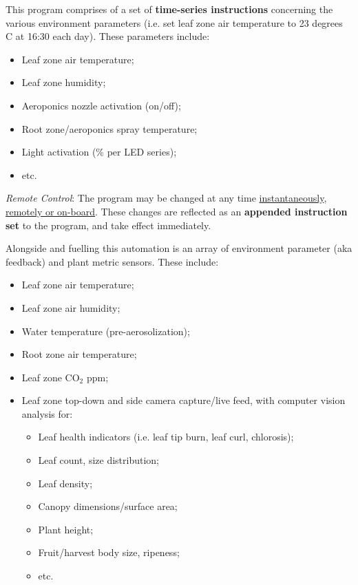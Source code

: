 \documentclass{report}
\begin{document}
This program comprises of a set of \textbf{time-series instructions} concerning the various environment parameters (i.e. set leaf zone air temperature to 23 degrees C at 16:30 each day). These parameters include:
\begin{itemize}
    \item Leaf zone air temperature;
    \item Leaf zone humidity;
    \item Aeroponics nozzle activation (on/off);
    \item Root zone/aeroponics spray temperature;
    \item Light activation (\% per LED series);
    \item etc.
\end{itemize}

\textit{Remote Control}: The program may be changed at any time \uline{instantaneously}, \uline{remotely or on-board}. These changes are reflected as an \textbf{appended instruction set} to the program, and take effect immediately. 

Alongside and fuelling this automation is an array of environment parameter (aka feedback) and plant metric sensors. These include:
\begin{itemize}
    \item Leaf zone air temperature;
    \item Leaf zone air humidity;
    \item Water temperature (pre-aerosolization);
    \item Root zone air temperature;
    \item Leaf zone CO${}_2$ ppm;
    \item Leaf zone top-down and side camera capture/live feed, with computer vision analysis for:
    \begin{itemize}
        \item Leaf health indicators (i.e. leaf tip burn, leaf curl, chlorosis);
        \item Leaf count, size distribution;
        \item Leaf density;
        \item Canopy dimensions/surface area;
        \item Plant height;
        \item Fruit/harvest body size, ripeness;
        \item etc.
    \end{itemize}
\end{itemize}
\end{document}
